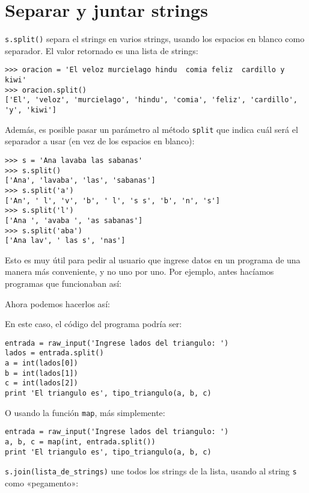 \section{Separar y juntar strings}

\lstinline!s.split()! separa el strings en varios strings, usando los
espacios en blanco como separador. El valor retornado es una lista de
strings:

\begin{lstlisting}
>>> oracion = 'El veloz murcielago hindu  comia feliz  cardillo y kiwi'
>>> oracion.split()
['El', 'veloz', 'murcielago', 'hindu', 'comia', 'feliz', 'cardillo', 'y', 'kiwi']
\end{lstlisting}

Además, es posible pasar un parámetro al método \lstinline!split! que
indica cuál será el separador a usar (en vez de los espacios en blanco):

\begin{lstlisting}
>>> s = 'Ana lavaba las sabanas'
>>> s.split()
['Ana', 'lavaba', 'las', 'sabanas']
>>> s.split('a')
['An', ' l', 'v', 'b', ' l', 's s', 'b', 'n', 's']
>>> s.split('l')
['Ana ', 'avaba ', 'as sabanas']
>>> s.split('aba')
['Ana lav', ' las s', 'nas']
\end{lstlisting}

Esto es muy útil para pedir al usuario que ingrese datos en un programa
de una manera más conveniente, y no uno por uno. Por ejemplo, antes
hacíamos programas que funcionaban así:

Ahora podemos hacerlos así:

En este caso, el código del programa podría ser:

\begin{lstlisting}
entrada = raw_input('Ingrese lados del triangulo: ')
lados = entrada.split()
a = int(lados[0])
b = int(lados[1])
c = int(lados[2])
print 'El triangulo es', tipo_triangulo(a, b, c)
\end{lstlisting}

O usando la función \lstinline!map!, más simplemente:

\begin{lstlisting}
entrada = raw_input('Ingrese lados del triangulo: ')
a, b, c = map(int, entrada.split())
print 'El triangulo es', tipo_triangulo(a, b, c)
\end{lstlisting}

\lstinline!s.join(lista_de_strings)! une todos los strings de la lista,
usando al string \lstinline!s! como «pegamento»:

